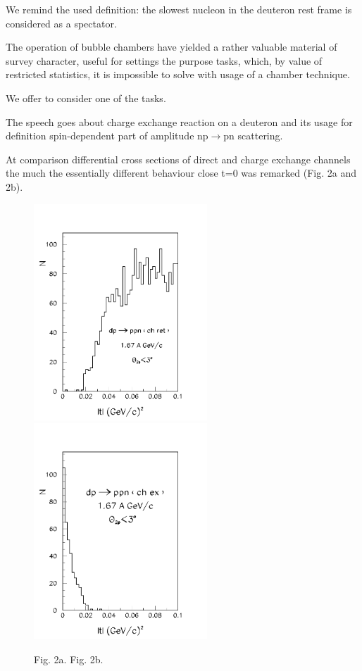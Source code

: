 \documentclass[a4paper,12pt]{article}
\begin{document}
We remind the used definition: the slowest nucleon in the deuteron rest frame is
considered as a spectator.

The operation of bubble chambers have yielded a rather valuable material of
survey character, useful for settings the purpose tasks, which, by value of
restricted statistics, it is impossible to solve with usage of a chamber
technique.

We offer to consider one of the tasks.

The speech goes about charge exchange reaction on a deuteron and its usage for
definition spin-dependent part of amplitude np$\to$pn
scattering.

At comparison differential cross sections of direct and charge exchange channels
the much the essentially different behaviour  close t=0 was remarked (Fig. 2a
and 2b).

\begin{figure}[hbt]
  \begin{center}
    \includegraphics[width=6.5cm]{ppncrt.pdf}
    \includegraphics[width=6.5cm]{ppnce.pdf}
  \end{center}
  \vspace{0,4mm}
  \noindent
  \hspace{3cm} Fig. 2a. \hspace{6cm} Fig. 2b. \\
\end{figure}
\end{document}
